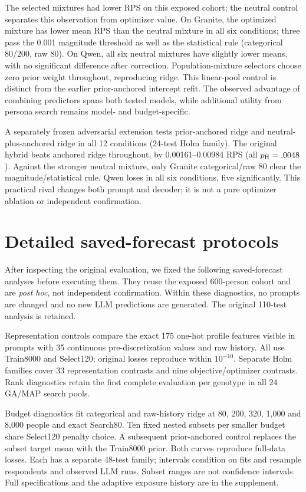 \documentclass[10pt,twocolumn]{article}
\begin{document}
The selected mixtures had lower RPS on this exposed cohort; the neutral
control separates this observation from optimizer value. On Granite, the optimized mixture has lower
mean RPS than the neutral mixture in all six conditions; three pass the
0.001 magnitude threshold as well as the statistical rule (categorical 80/200,
raw 80). On Qwen, all six neutral mixtures have slightly lower means, with no
significant difference after correction. Population-mixture selectors choose
zero prior weight throughout, reproducing ridge. This linear-pool control is
distinct from the earlier prior-anchored intercept refit. The observed advantage of combining predictors spans both tested models,
while additional utility from persona search remains model- and budget-specific.

A separately frozen adversarial extension tests prior-anchored ridge and
neutral-plus-anchored ridge in all 12 conditions (24-test Holm family).
The original hybrid beats anchored ridge throughout, by 0.00161--0.00984 RPS
(all $p_{\rm H}=.0048$). Against the stronger neutral mixture, only Granite
categorical/raw 80 clear the magnitude/statistical rule. Qwen loses in all
six conditions, five significantly. This practical rival changes both prompt
and decoder; it is not a pure optimizer ablation or independent confirmation.




\section{Detailed saved-forecast protocols}
After inspecting the original evaluation, we fixed the following saved-forecast
analyses before executing them. They reuse the exposed 600-person cohort and
are \emph{post hoc}, not independent confirmation. Within these diagnostics,
no prompts are changed and no new LLM predictions are generated. The original
110-test analysis is retained.

Representation controls compare the exact 175 one-hot profile features
visible in prompts with 35 continuous pre-discretization values and raw
history. All use Train8000 and Select120; original losses reproduce within
$10^{-10}$. Separate Holm families cover 33 representation contrasts and
nine objective/optimizer contrasts. Rank diagnostics retain the first
complete evaluation per genotype in all 24 GA/MAP search pools.

Budget diagnostics fit categorical and raw-history ridge at 80, 200, 320,
1,000 and 8,000 people and exact Search80. Ten fixed nested subsets per
smaller budget share Select120 penalty choice. A subsequent prior-anchored
control replaces the subset target mean with the Train8000 prior. Both
curves reproduce full-data losses. Each has a separate 48-test family;
intervals condition on fits and resample respondents and observed LLM runs.
Subset ranges are not confidence intervals. Full specifications and the
adaptive exposure history are in the supplement.
\end{document}
